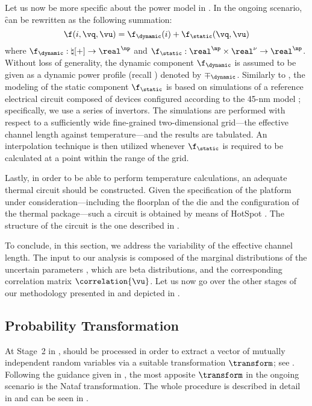Let us now be more specific about the power model in .
In the ongoing scenario, \f can be rewritten as the following summation:
\[
  \f(i, \vq, \vu) = \f_\dynamic(i) + \f_\static(\vq, \vu)
\]
where $\f_\dynamic: \natural[+] \to \real^\np$ and $\f_\static: \real^\np \times
\real^\nu \to \real^\np$. Without loss of generality, the dynamic component
$\f_\dynamic$ is assumed to be given as a dynamic power profile (recall
) denoted by $\mp_\dynamic$. Similarly to
, the modeling of the static component $\f_\static$ is based
on  simulations of a reference electrical circuit composed of
 devices \cite{bsim} configured according to the 45-nm 
 model \cite{ptm}; specifically, we use a series of  invertors.
The simulations are performed with respect to a sufficiently wide fine-grained
two-dimensional grid---the effective channel length against temperature---and
the results are tabulated. An interpolation technique is then utilized whenever
$\f_\static$ is required to be calculated at a point within the range of the
grid.

Lastly, in order to be able to perform temperature calculations, an adequate
thermal  circuit should be constructed. Given the specification of the
platform under consideration---including the floorplan of the die and the
configuration of the thermal package---such a circuit is obtained by means of
HotSpot \cite{skadron2003}. The structure of the circuit is the one described in
.

To conclude, in this section, we address the variability of the effective
channel length. The input to our analysis is composed of the marginal
distributions of the uncertain parameters \vu, which are beta distributions, and
the corresponding correlation matrix $\correlation{\vu}$. Let us now go over the
other stages of our methodology presented in 
and depicted in .

\subsection{Probability Transformation}

At Stage~2 in , \vu should be processed in order to extract
a vector of mutually independent random variables \vz via a suitable
transformation $\transform$; see . Following the
guidance given in , the most apposite $\transform$ in
the ongoing scenario is the Nataf transformation. The whole procedure is
described in detail in  and can be seen in
.

